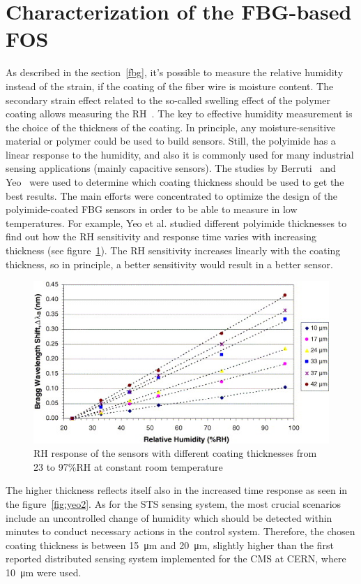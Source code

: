 \section{Characterization of the FBG-based FOS}
As described in the section~\ref{fbg}, it's possible to measure the relative humidity instead of the strain, if the coating of the fiber wire is moisture content. The secondary strain effect related to the so-called swelling effect of the polymer coating allows measuring the \gls{RH}~\cite{YEO_PI}. The key to effective humidity measurement is the choice of the thickness of the coating. In principle, any moisture-sensitive material or polymer could be used to build sensors. Still, the polyimide has a linear response to the humidity, and also it is commonly used for many industrial sensing applications (mainly capacitive sensors). The studies by Berruti~\cite{Berruti} and Yeo~\cite{YEO_PI} were used to determine which coating thickness should be used to get the best results. The main efforts were concentrated to optimize the design of the polyimide-coated FBG sensors in order to be able to measure in low temperatures. For example, Yeo et al. \cite{YEO_PI} studied different polyimide thicknesses to find out how the \gls{RH} sensitivity and response time varies with increasing thickness (see figure~\ref{fig:yeo}). The \gls{RH} sensitivity increases linearly with the coating thickness, so in principle, a better sensitivity would result in a better sensor.
\begin{figure}[!h]
\centering
\includegraphics[width=0.75\columnwidth]{Chapter5/images/yeo_coating.jpg}
\caption{RH response of the sensors with different coating thicknesses from 23 to 97\%RH at constant room temperature~\cite{YEO_PI}}
\label{fig:yeo}
\end{figure}
The higher thickness reflects itself also in the increased time response as seen in the figure~\ref{fig:yeo2}. As for the \gls{STS} sensing system, the most crucial scenarios include an uncontrolled change of humidity which should be detected within minutes to conduct necessary actions in the control system. Therefore, the chosen coating thickness is between \SI{15}{\micro\metre} and \SI{20}{\micro\metre}, slightly higher than the first reported distributed sensing system implemented for the \gls{CMS} at \gls{CERN}, where \SI{10}{\micro\metre} were used. 
